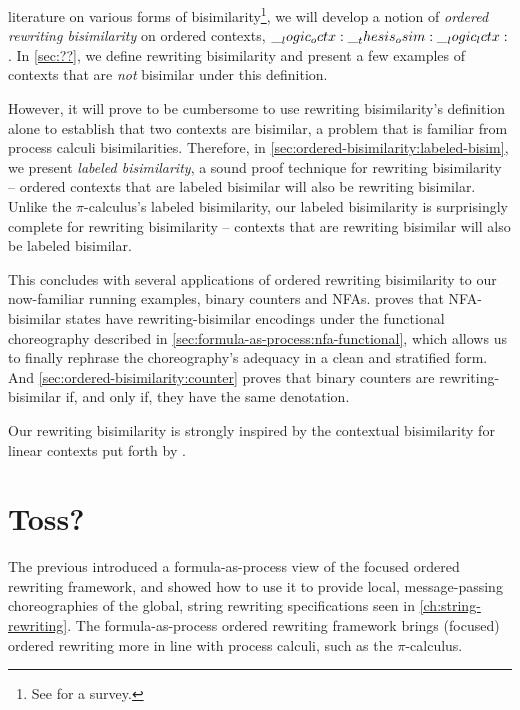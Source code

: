  literature on various forms of bisimilarity\footnote{See \textcite{??} for a survey.}, we will develop a notion of \emph{ordered rewriting bisimilarity} on ordered contexts, $\__logic_octx: \__thesis_osim: \__logic_lctx:$.
In \cref{sec:??}, we define rewriting bisimilarity and present a few examples of contexts that are \emph{not} bisimilar under this definition.

However, it will prove to be cumbersome to use rewriting bisimilarity's definition alone to establish that two contexts are bisimilar, a problem that is familiar from process calculi bisimilarities.
Therefore, in \cref{sec:ordered-bisimilarity:labeled-bisim}, we present \emph{labeled bisimilarity}, a sound proof technique for rewriting bisimilarity -- ordered contexts that are labeled bisimilar will also be rewriting bisimilar.
Unlike the $\pi$-calculus's labeled bisimilarity, our labeled bisimilarity is surprisingly complete for rewriting bisimilarity -- contexts that are rewriting bisimilar will also be labeled bisimilar.

This  concludes with several applications of ordered rewriting bisimilarity to our now-familiar running examples, binary counters and \aclp*{NFA}.
 proves that \ac{NFA}-bisimilar states have rewriting-bisimilar encodings under the functional choreography described in \cref{sec:formula-as-process:nfa-functional}, which allows us to finally rephrase the choreography's adequacy in a clean and stratified form.
And \cref{sec:ordered-bisimilarity:counter} proves that binary counters are rewriting-bisimilar if, and only if, they have the same denotation.

Our rewriting bisimilarity is strongly inspired by the contextual bisimilarity for linear contexts put forth by \textcite{Deng+:MSCS16}.


\section{Toss?}

The previous  introduced a formula-as-process view of the focused ordered rewriting framework, and showed how to use it to provide local, message-passing choreographies of the global, string rewriting specifications seen in \cref{ch:string-rewriting}.
The formula-as-process ordered rewriting framework brings (focused) ordered rewriting more in line with process calculi, such as the $\pi$-calculus.

